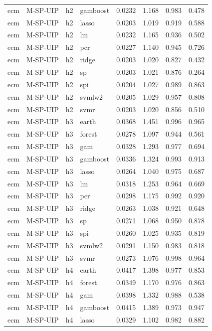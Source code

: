 \begin{ThreePartTable}
\begin{longtable}[t]{llclcccc}
ecm & M-SP-UIP & h2 & gamboost & 0.0232 & 1.168 & 0.983 & 0.478\\
ecm & M-SP-UIP & h2 & lasso & 0.0203 & 1.019 & 0.919 & 0.588\\
ecm & M-SP-UIP & h2 & lm & 0.0232 & 1.165 & 0.936 & 0.502\\
ecm & M-SP-UIP & h2 & pcr & 0.0227 & 1.140 & 0.945 & 0.726\\
ecm & M-SP-UIP & h2 & ridge & 0.0203 & 1.020 & 0.827 & 0.432\\
ecm & M-SP-UIP & h2 & sp & 0.0203 & 1.021 & 0.876 & 0.264\\
ecm & M-SP-UIP & h2 & spi & 0.0204 & 1.027 & 0.989 & 0.863\\
ecm & M-SP-UIP & h2 & svmlw2 & 0.0205 & 1.029 & 0.957 & 0.808\\
ecm & M-SP-UIP & h2 & svmr & 0.0203 & 1.020 & 0.856 & 0.510\\
\addlinespace
ecm & M-SP-UIP & h3 & earth & 0.0368 & 1.451 & 0.996 & 0.965\\
ecm & M-SP-UIP & h3 & forest & 0.0278 & 1.097 & 0.944 & 0.561\\
ecm & M-SP-UIP & h3 & gam & 0.0328 & 1.293 & 0.977 & 0.694\\
ecm & M-SP-UIP & h3 & gamboost & 0.0336 & 1.324 & 0.993 & 0.913\\
ecm & M-SP-UIP & h3 & lasso & 0.0264 & 1.040 & 0.975 & 0.687\\
ecm & M-SP-UIP & h3 & lm & 0.0318 & 1.253 & 0.964 & 0.669\\
ecm & M-SP-UIP & h3 & pcr & 0.0298 & 1.175 & 0.992 & 0.920\\
ecm & M-SP-UIP & h3 & ridge & 0.0263 & 1.038 & 0.921 & 0.648\\
ecm & M-SP-UIP & h3 & sp & 0.0271 & 1.068 & 0.950 & 0.878\\
ecm & M-SP-UIP & h3 & spi & 0.0260 & 1.025 & 0.935 & 0.819\\
ecm & M-SP-UIP & h3 & svmlw2 & 0.0291 & 1.150 & 0.983 & 0.818\\
ecm & M-SP-UIP & h3 & svmr & 0.0273 & 1.076 & 0.998 & 0.964\\
\addlinespace
ecm & M-SP-UIP & h4 & earth & 0.0417 & 1.398 & 0.977 & 0.853\\
ecm & M-SP-UIP & h4 & forest & 0.0349 & 1.170 & 0.976 & 0.863\\
ecm & M-SP-UIP & h4 & gam & 0.0398 & 1.332 & 0.988 & 0.538\\
ecm & M-SP-UIP & h4 & gamboost & 0.0415 & 1.389 & 0.973 & 0.947\\
ecm & M-SP-UIP & h4 & lasso & 0.0329 & 1.102 & 0.982 & 0.882\\

\end{longtable}
\end{ThreePartTable}
